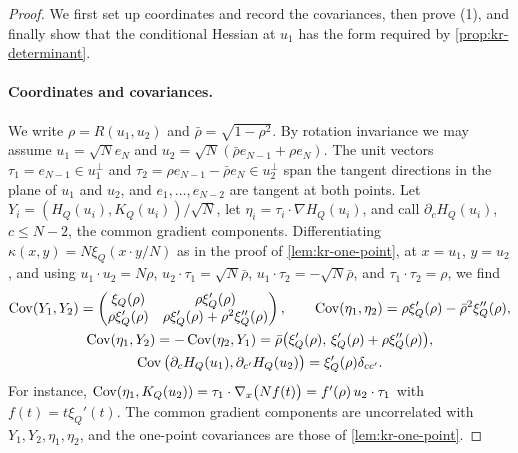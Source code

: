 \begin{proof}
We first set up coordinates and record the covariances, then prove (1), and finally show that the conditional Hessian at $u_1$ has the form required by \cref{prop:kr-determinant}.

\paragraph{Coordinates and covariances.}
We write $\rho=R(u_1,u_2)$ and $\bar\rho=\sqrt{1-\rho^2}$. By rotation invariance we may assume $u_1=\sqrt Ne_N$ and $u_2=\sqrt N(\bar\rho e_{N-1}+\rho e_N)$. The unit vectors $\tau_1=e_{N-1}\in u_1^\perp$ and $\tau_2=\rho e_{N-1}-\bar\rho e_N\in u_2^\perp$ span the tangent directions in the plane of $u_1$ and $u_2$, and $e_1,\dots,e_{N-2}$ are tangent at both points. Let $Y_i=(H_Q(u_i),K_Q(u_i))/\sqrt N$, let $\eta_i=\tau_i\cdot\nabla H_Q(u_i)$, and call $\partial_cH_Q(u_i)$, $c\le N-2$, the common gradient components. Differentiating $\kappa(x,y)=N\xi_Q(x\cdot y/N)$ as in the proof of \cref{lem:kr-one-point}, at $x=u_1$, $y=u_2$, and using $u_1\cdot u_2=N\rho$, $u_2\cdot\tau_1=\sqrt N\bar\rho$, $u_1\cdot\tau_2=-\sqrt N\bar\rho$, and $\tau_1\cdot\tau_2=\rho$, we find
\begin{equation}\label{eq:kr-two-point-cov}
\begin{gathered}
\operatorname{Cov}(Y_1,Y_2)=\begin{pmatrix}\xi_Q(\rho)&\rho\xi_Q'(\rho)\\\rho\xi_Q'(\rho)&\rho\xi_Q'(\rho)+\rho^2\xi_Q''(\rho)\end{pmatrix},\qquad \operatorname{Cov}(\eta_1,\eta_2)=\rho\xi_Q'(\rho)-\bar\rho^2\xi_Q''(\rho),\\
\operatorname{Cov}(\eta_1,Y_2)=-\operatorname{Cov}(\eta_2,Y_1)=\bar\rho\big(\xi_Q'(\rho),\,\xi_Q'(\rho)+\rho\xi_Q''(\rho)\big),\\
\operatorname{Cov}\big(\partial_cH_Q(u_1),\partial_{c'}H_Q(u_2)\big)=\xi_Q'(\rho)\delta_{cc'}.
\end{gathered}
\end{equation}
For instance, $\operatorname{Cov}(\eta_1,K_Q(u_2))=\tau_1\cdot\nabla_x\big(Nf(t)\big)=f'(\rho)\,u_2\cdot\tau_1$ with $f(t)=t\xi_Q'(t)$. The common gradient components are uncorrelated with $Y_1,Y_2,\eta_1,\eta_2$, and the one-point covariances are those of \cref{lem:kr-one-point}.


\end{proof}
